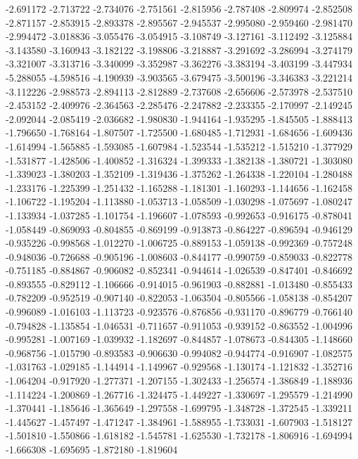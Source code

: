 -2.691172
-2.713722
-2.734076
-2.751561
-2.815956
-2.787408
-2.809974
-2.852508
-2.871157
-2.853915
-2.893378
-2.895567
-2.945537
-2.995080
-2.959460
-2.981470
-2.994472
-3.018836
-3.055476
-3.054915
-3.108749
-3.127161
-3.112492
-3.125884
-3.143580
-3.160943
-3.182122
-3.198806
-3.218887
-3.291692
-3.286994
-3.274179
-3.321007
-3.313716
-3.340099
-3.352987
-3.362276
-3.383194
-3.403199
-3.447934
-5.288055
-4.598516
-4.190939
-3.903565
-3.679475
-3.500196
-3.346383
-3.221214
-3.112226
-2.988573
-2.894113
-2.812889
-2.737608
-2.656606
-2.573978
-2.537510
-2.453152
-2.409976
-2.364563
-2.285476
-2.247882
-2.233355
-2.170997
-2.149245
-2.092044
-2.085419
-2.036682
-1.980830
-1.944164
-1.935295
-1.845505
-1.888413
-1.796650
-1.768164
-1.807507
-1.725500
-1.680485
-1.712931
-1.684656
-1.609436
-1.614994
-1.565885
-1.593085
-1.607984
-1.523544
-1.535212
-1.515210
-1.377929
-1.531877
-1.428506
-1.400852
-1.316324
-1.399333
-1.382138
-1.380721
-1.303080
-1.339023
-1.380203
-1.352109
-1.319436
-1.375262
-1.264338
-1.220104
-1.280488
-1.233176
-1.225399
-1.251432
-1.165288
-1.181301
-1.160293
-1.144656
-1.162458
-1.106722
-1.195204
-1.113880
-1.053713
-1.058509
-1.030298
-1.075697
-1.080247
-1.133934
-1.037285
-1.101754
-1.196607
-1.078593
-0.992653
-0.916175
-0.878041
-1.058449
-0.869093
-0.804855
-0.869199
-0.913873
-0.864227
-0.896594
-0.946129
-0.935226
-0.998568
-1.012270
-1.006725
-0.889153
-1.059138
-0.992369
-0.757248
-0.948036
-0.726688
-0.905196
-1.008603
-0.844177
-0.990759
-0.859033
-0.822778
-0.751185
-0.884867
-0.906082
-0.852341
-0.944614
-1.026539
-0.847401
-0.846692
-0.893555
-0.829112
-1.106666
-0.914015
-0.961903
-0.882881
-1.013480
-0.855433
-0.782209
-0.952519
-0.907140
-0.822053
-1.063504
-0.805566
-1.058138
-0.854207
-0.996089
-1.016103
-1.113723
-0.923576
-0.876856
-0.931170
-0.896779
-0.766140
-0.794828
-1.135854
-1.046531
-0.711657
-0.911053
-0.939152
-0.863552
-1.004996
-0.995281
-1.007169
-1.039932
-1.182697
-0.844857
-1.078673
-0.844305
-1.148660
-0.968756
-1.015790
-0.893583
-0.906630
-0.994082
-0.944774
-0.916907
-1.082575
-1.031763
-1.029185
-1.144914
-1.149967
-0.929568
-1.130174
-1.121832
-1.352716
-1.064204
-0.917920
-1.277371
-1.207155
-1.302433
-1.256574
-1.386849
-1.188936
-1.114224
-1.200869
-1.267716
-1.324475
-1.449227
-1.330697
-1.295579
-1.214990
-1.370441
-1.185646
-1.365649
-1.297558
-1.699795
-1.348728
-1.372545
-1.339211
-1.445627
-1.457497
-1.471247
-1.384961
-1.588955
-1.733031
-1.607903
-1.518127
-1.501810
-1.550866
-1.618182
-1.545781
-1.625530
-1.732178
-1.806916
-1.694994
-1.666308
-1.695695
-1.872180
-1.819604
